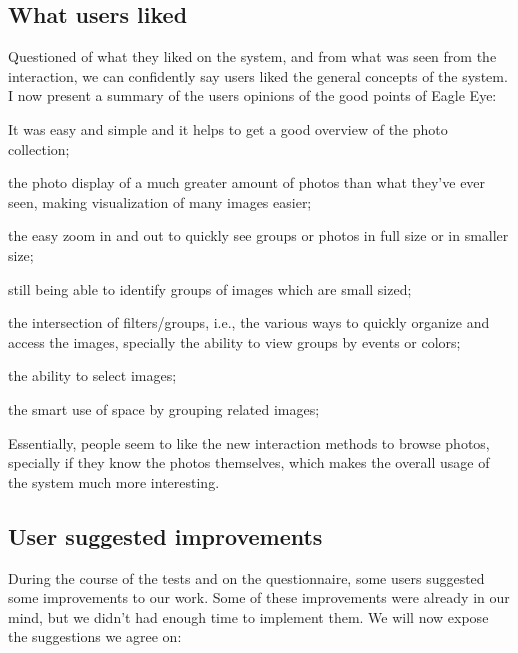 \subsection{What users liked}

Questioned of what they liked on the system, and from what was seen from the interaction, we can confidently say users liked the general concepts of the system. I now present a summary of the users opinions of the good points of Eagle Eye:

\pagebreak

\begin{myitemize}
\item It was easy and simple and it helps to get a good overview of the photo collection;
\item the photo display of a much greater amount of photos than what they've ever seen, making visualization of many images easier;
\item the easy zoom in and out to quickly see groups or photos in full size or in smaller size;
\item still being able to identify groups of images which are small sized;
\item the intersection of filters/groups, i.e., the various ways to quickly organize and access the images, specially the ability to view groups by events or colors;
\item the ability to select images;
\item the smart use of space by grouping related images;
\end{myitemize}

Essentially, people seem to like the new interaction methods to browse photos, specially if they know the photos themselves, which makes the overall usage of the system much more interesting.




\subsection{User suggested improvements}
\label{improvs}

During the course of the tests and on the questionnaire, some users suggested some improvements to our work. Some of these improvements were already in our mind, but we didn't had enough time to implement them. We will now expose the suggestions we agree on:

